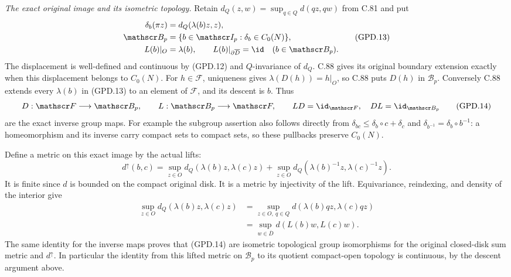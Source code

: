 \emph{The exact original image and its isometric topology.}
Retain $d_Q(z,w)=\sup_{q\in Q}d(qz,qw)$ from C.81 and put
\[
 \begin{split}
 \delta_b(\pi z)&=d_Q(\lambda(b)z,z),\\
 \mathscr B_p&=\{b\in\mathscr I_p:\delta_b\in C_0(N)\},\\
 L(b)|_O&=\lambda(b),\qquad
 L(b)|_{\partial\overline D}=\id\quad(b\in\mathscr B_p).
 \end{split}                                                   \tag{GPD.13}
\]
The displacement is well-defined and continuous by (GPD.12)
and $Q$-invariance of $d_Q$. C.88 gives its original boundary
extension exactly when this displacement belongs to $C_0(N)$.
For $h\in\mathscr F$, uniqueness gives
$\lambda(D(h))=h|_O$, so C.88 puts $D(h)$ in $\mathscr B_p$.
Conversely C.88 extends every $\lambda(b)$ in (GPD.13) to
an element of $\mathscr F$, and its descent is $b$. Thus
\[
 D:\mathscr F\longrightarrow\mathscr B_p,\qquad
 L:\mathscr B_p\longrightarrow\mathscr F,\qquad
 LD=\id_{\mathscr F},\quad DL=\id_{\mathscr B_p}
                                                               \tag{GPD.14}
\]
are the exact inverse group maps.
For example the subgroup assertion also follows directly from
$\delta_{bc}\leq\delta_b\circ c+\delta_c$ and
$\delta_{b^{-1}}=\delta_b\circ b^{-1}$: a homeomorphism and its
inverse carry compact sets to compact sets, so these pullbacks
preserve $C_0(N)$.

Define a metric on this exact image by the actual lifts:
\[
 d^\uparrow(b,c)=
 \sup_{z\in O}d_Q(\lambda(b)z,\lambda(c)z)
 +\sup_{z\in O}d_Q(\lambda(b)^{-1}z,\lambda(c)^{-1}z).
                                                               \tag{GPD.15}
\]
It is finite since $d$ is bounded on the compact original disk.
It is a metric by injectivity of the lift. Equivariance,
reindexing, and density of the interior give
\[
 \begin{split}
 \sup_{z\in O}d_Q(\lambda(b)z,\lambda(c)z)
 &=\sup_{z\in O,\ q\in Q}d(\lambda(b)qz,\lambda(c)qz)\\
 &=\sup_{w\in\overline D}d(L(b)w,L(c)w).
 \end{split}                                                   \tag{GPD.16}
\]
The same identity for the inverse maps proves that (GPD.14)
are isometric topological group isomorphisms for the original
closed-disk sum metric and $d^\uparrow$.
In particular the identity from this lifted metric on
$\mathscr B_p$ to its quotient compact-open topology is
continuous, by the descent argument above.

